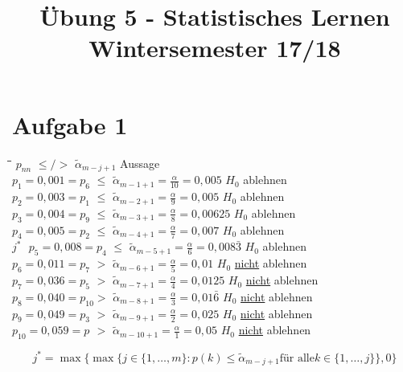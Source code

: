 \documentclass[10pt,a4paper]{article}
\title{Übung 5 - Statistisches Lernen\\ \large{Wintersemester 17/18}}
\date{}
\begin{document}
\maketitle
\section*{Aufgabe 1}

\begin{tabbing}
	\hspace{90pt}\=\hspace{30pt}\=\hspace{130pt}\=\kill
	\(p_{nn}\)\> \(\leq / >\)   \> \(\tilde{\alpha}_{m-j+1}\)  \> Aussage\\	
	\(p_{1} = 0,001 = p_{6}\)\> \(\leq\) \> \(\tilde{\alpha} _{m-1+1} = \frac{\alpha}{10} = 0,005\)  \> \(H_0\) ablehnen \\	
	\(p_{2} = 0,003 = p_{1}\)\> \(\leq\)  \>\(\tilde{\alpha} _{m-2+1} = \frac{\alpha}{9} = 0,005\)  \>  \(H_0\) ablehnen\\	
	\(p_{3} = 0,004 = p_{9}\)\> \(\leq\)  \> \(\tilde{\alpha} _{m-3+1} = \frac{\alpha}{8} = 0,00625\) \> \(H_0\) ablehnen \\	
	\(p_{4} = 0,005 = p_{2}\)\> \(\leq\)  \> \(\tilde{\alpha} _{m-4+1} = \frac{\alpha}{7} = 0,007\) \> \(H_0\) ablehnen \\	
	\(j^* \text{ } p_{5} = 0,008 = p_{4}\)\>  \(\leq\) \> \(\tilde{\alpha} _{m-5+1} = \frac{\alpha}{6} = 0,008\bar{3}\)  \> \(H_0\) ablehnen\\	
	\(p_{6} = 0,011 = p_{7}\)\> \(>\)  \> \(\tilde{\alpha} _{m-6+1} = \frac{\alpha}{5} = 0,01\) \> \(H_0\) \underline{nicht} ablehnen\\	
	\(p_{7} = 0,036 = p_{5}\)\> \(>\) \>\(\tilde{\alpha}_{m-7+1} = \frac{\alpha}{4} = 0,0125\)  \>  \(H_0\) \underline{nicht} ablehnen\\	
	\(p_{8} = 0,040 = p_{10}\)\>\(>\)  \>\(\tilde{\alpha} _{m-8+1} = \frac{\alpha}{3} = 0,01\bar{6}\)  \> \(H_0\) \underline{nicht} ablehnen \\	
	\(p_{9} = 0,049 = p_{3}\)\> \(>\) \>  \(\tilde{\alpha} _{m-9+1} = \frac{\alpha}{2} = 0,025\)\> \(H_0\) \underline{nicht} ablehnen \\	
	\(p_{10} = 0,059 = p_{}\)\> \(>\) \>  \(\tilde{\alpha} _{m-10+1} = \frac{\alpha}{1} = 0,05\)\>  \(H_0\) \underline{nicht} ablehnen\\		
\end{tabbing} 
\[j^* = \max\{ \max\{ j \in\{1,\ldots,m\} : p(k)\leq \tilde{\alpha}_{m-j+1} \text{für alle} k \in\{1, \ldots, j\} \}, 0 \} \]
\end{document}
